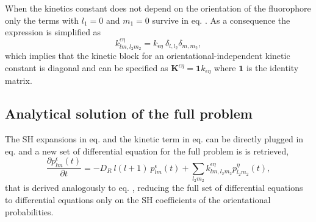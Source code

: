 \documentclass{article}
\begin{document}
When the kinetics constant does not depend on the orientation of the fluorophore only the terms with $l_1=0$ and $m_1=0$ survive in eq. . As a consequence the expression is simplified as
\begin{equation}
    k^{\epsilon\eta}_{lm,l_2m_2} = k_{\epsilon\eta} \ \delta_{l, l_2} \delta_{m, m_2},
\end{equation}
which implies that the kinetic block for an orientational-independent kinetic constant is diagonal and can be specified as $\mathbf{K}^{\epsilon\eta} = \mathbf{1}k_{\epsilon\eta}$ where $\mathbf{1}$ is the identity matrix.

\subsection{Analytical solution of the full problem}
The SH expansions in eq.  and the kinetic term in eq.  can be directly plugged in eq.  and a new set of differential equation for the full problem is is retrieved,
\begin{equation}\label{eq:time_evoution_coeffs}
        \frac{\partial p^\epsilon_{lm}(t)}{\partial t} =
        -D_R \ l(l+1) \ p^\epsilon_{lm}(t)
        +\sum_{l_2m_2} 
        k^{\epsilon\eta}_{lm,l_2m_2} p^{\eta}_{l_2m_2}(t),
\end{equation}
that is derived analogously to eq. , reducing the full set of differential equations to differential equations only on the SH coefficients of the orientational probabilities.
\end{document}
